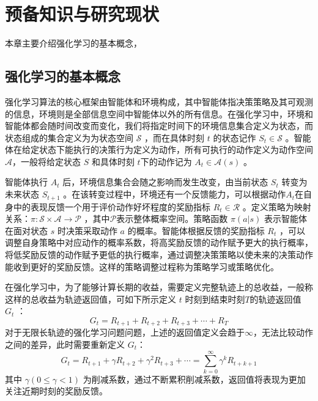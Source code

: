 
\chapter{预备知识与研究现状}\label{chap:background}

本章主要介绍强化学习的基本概念，

\section{强化学习的基本概念}

强化学习算法的核心框架由智能体和环境构成，其中智能体指决策策略及其可观测的信息，环境则是全部信息空间中智能体以外的所有信息。在强化学习中，环境和智能体都会随时间改变而变化，我们将指定时间下的环境信息集合定义为状态，而状态组成的集合定义为为状态空间 $\mathcal S$ ，而在具体时刻 $t$ 的状态记作 $S_t\in \mathcal S$ 。智能体在给定状态下能执行的决策行为定义为动作，所有可执行的动作定义为动作空间$\mathcal{A}$，一般将给定状态 $S$ 和具体时刻 $t$下的动作记为 $A_t\in\mathcal{A}(s)$ 。

智能体执行 $A_t$ 后，环境信息集合会随之影响而发生改变，由当前状态 $S_t$ 转变为未来状态 $S_{t+1}$ 。在该转变过程中，环境还有一个反馈能力，可以根据动作$A_t$在自身中的表现反馈一个用于评价动作好坏程度的奖励指标 $R_{t}\in\mathcal{R}$ 。定义策略为映射关系：$\pi:\mathcal{S}\times\mathcal{A}\to \mathcal{P}$ ，其中$\mathcal P$表示整体概率空间。策略函数 $\pi(a|s)$ 表示智能体在面对状态 $s$ 时决策采取动作 $a$ 的概率。智能体根据反馈的奖励指标 $R_{t}$ ，可以调整自身策略中对应动作的概率系数，将高奖励反馈的动作赋予更大的执行概率，将低奖励反馈的动作赋予更低的执行概率，通过调整决策策略以使未来的决策动作能收到更好的奖励反馈。这样的策略调整过程称为策略学习或策略优化。

在强化学习中，为了能够计算长期的收益，需要定义完整轨迹上的总收益，一般称这样的总收益为轨迹返回值，可如下所示定义 $t$ 时刻到结束时刻$T$的轨迹返回值 $G_t$ ：
\begin{equation}
G_t = R_{t+1}+R_{t+2}+R_{t+3}+\cdots+R_T
\end{equation}
对于无限长轨迹的强化学习问题问题，上述的返回值定义会趋于$\infty$，无法比较动作之间的差异，此时需要重新定义 $G_t$：
\begin{equation}
G_t = R_{t+1}+\gamma R_{t+2}+\gamma^2 R_{t+3}+\cdots = \sum_{k=0}^{\infty}\gamma^kR_{t+k+1}
\end{equation}
其中 $\gamma(0\leq \gamma < 1)$ 为削减系数，通过不断累积削减系数，返回值将表现为更加关注近期时刻的奖励反馈。

